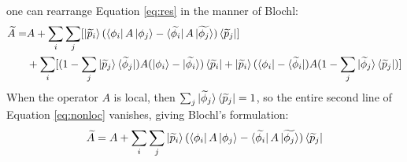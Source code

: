 \documentclass[12pt]{article}
\begin{document}
one can rearrange Equation \ref{eq:res} in the manner of Blochl\cite{blochl}:
\begin{equation}
\begin{split}
\widetilde{A}= & A+\sum_i\sum_j[\ket{\widetilde{p}_i}(\bra{\phi_i}A\ket{\phi_j}
-\bra{\widetilde{\phi_i}}A\ket{\widetilde{\phi_j}})\bra{\widetilde{p}_j}] \\
& +\sum_i[(1-\sum_j\ket{\widetilde{p}_j}\bra{\widetilde{\phi}_j})A(\ket{\phi_i}-\ket{\widetilde{\phi_i}})
\bra{\widetilde{p}_i}+\ket{\widetilde{p}_i}
(\bra{\phi_i}-\bra{\widetilde{\phi}_i})A(1-\sum_j\ket{\widetilde{\phi}_j}\bra{\widetilde{p}_j})]
\end{split}
\label{eq:nonloc}
\end{equation}
When the operator $A$ is local, then $\sum_j\ket{\widetilde{\phi}_j}\bra{\widetilde{p}_j}=1$,
so the entire second line of Equation \ref{eq:nonloc} vanishes, giving Blochl's formulation:\cite{blochl}
\begin{equation}
\widetilde{A}=A+\sum_i\sum_j\ket{\widetilde{p}_i}(\bra{\phi_i}A\ket{\phi_j}
-\bra{\widetilde{\phi_i}}A\ket{\widetilde{\phi_j}})\bra{\widetilde{p}_j}
\label{eq:loc}
\end{equation}
\end{document}
